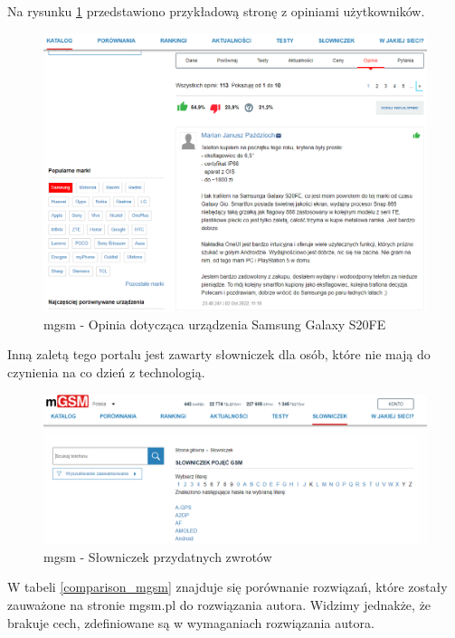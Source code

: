 \newpage
Na rysunku \ref*{mgsm_4} przedstawiono przykładową stronę z opiniami użytkowników.
\begin{figure}[H]
    \centering
    \includegraphics[scale=0.45]{img/mgsm/mgsmComments.png}
    \caption{mgsm - Opinia dotycząca urządzenia Samsung Galaxy S20FE}
    \label{mgsm_4}
\end{figure}
Inną zaletą tego portalu jest zawarty słowniczek dla osób, które nie mają do czynienia na co dzień z technologią. 
\begin{figure}[H]
    \centering
    \includegraphics[scale=0.47]{img/mgsm/dictonary.png}
    \caption{mgsm - Słowniczek przydatnych zwrotów }
    \label{mgsm_5}
\end{figure}
W tabeli \ref*{comparison_mgsm} znajduje się porównanie rozwiązań, które zostały zauważone na stronie mgsm.pl do rozwiązania autora. Widzimy jednakże, że brakuje cech, zdefiniowane są w wymaganiach rozwiązania autora.
